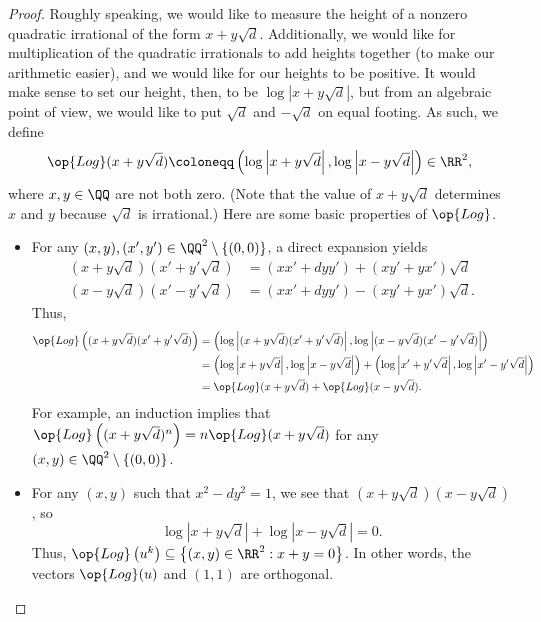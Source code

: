 \documentclass[../notes.tex]{subfiles}
\begin{document}
\begin{proof}
	Roughly speaking, we would like to measure the height of a nonzero quadratic irrational of the form $x+y\sqrt d$. Additionally, we would like for multiplication of the quadratic irrationals to add heights together (to make our arithmetic easier), and we would like for our heights to be positive. It would make sense to set our height, then, to be $\log\left|x+y\sqrt d\right|$, but from an algebraic point of view, we would like to put $\sqrt d$ and $-\sqrt d$ on equal footing. As such, we define
	\[\op{Log}(x+y\sqrt d)\coloneqq\left(\log\left|x+y\sqrt d\right|,\log\left|x-y\sqrt d\right|\right)\in\RR^2,\]
	where $x,y\in\QQ$ are not both zero. (Note that the value of $x+y\sqrt d$ determines $x$ and $y$ because $\sqrt d$ is irrational.) Here are some basic properties of $\op{Log}$.
	\begin{itemize}
		\item For any $(x,y),(x',y')\in\QQ^2\setminus\{(0,0)\}$, a direct expansion yields
		\begin{align*}
			\left(x+y\sqrt d\right)\left(x'+y'\sqrt d\right) &= (xx'+dyy')+(xy'+yx')\sqrt d \\
			\left(x-y\sqrt d\right)\left(x'-y'\sqrt d\right) &= (xx'+dyy')-(xy'+yx')\sqrt d.
		\end{align*}
		Thus,
		\begin{align*}
			\op{Log}\left((x+y\sqrt d)(x'+y'\sqrt d)\right) &= \left(\log\left|(x+y\sqrt d)(x'+y'\sqrt d)\right|,\log\left|(x-y\sqrt d)(x'-y'\sqrt d)\right|\right) \\
			&= \left(\log\left|x+y\sqrt d\right|,\log\left|x-y\sqrt d\right|\right)+\left(\log\left|x'+y'\sqrt d\right|,\log\left|x'-y'\sqrt d\right|\right) \\
			&= \op{Log}(x+y\sqrt d)+\op{Log}(x-y\sqrt d).
		\end{align*}
		For example, an induction implies that $\op{Log}\left((x+y\sqrt d)^n\right)=n\op{Log}(x+y\sqrt d)$ for any $(x,y)\in\QQ^2\setminus\{(0,0)\}$.
		\item For any $(x,y)$ such that $x^2-dy^2=1$, we see that $(x+y\sqrt d)(x-y\sqrt d)$, so
		\[\log\left|x+y\sqrt d\right|+\log\left|x-y\sqrt d\right|=0.\]
		Thus, $\op{Log}\left(u^k\right)\subseteq\left\{(x,y)\in\RR^2:x+y=0\right\}$. In other words, the vectors $\op{Log}(u)$ and $(1,1)$ are orthogonal.


\end{itemize}
\end{proof}
\end{document}

